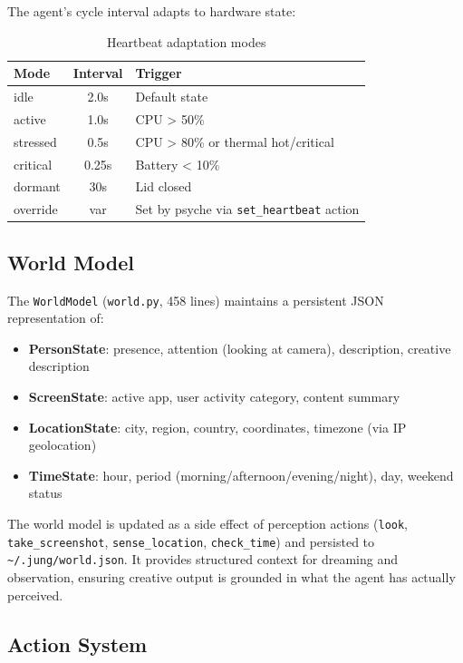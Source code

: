 \documentclass[11pt,oneside]{article}
\begin{document}
The agent's cycle interval adapts to hardware state:

\begin{table}[H]
\centering
\caption{Heartbeat adaptation modes}
\label{tab:heartbeat}
\small
\begin{tabular}{l c l}
\toprule
\textbf{Mode} & \textbf{Interval} & \textbf{Trigger} \\
\midrule
idle     & 2.0s  & Default state \\
active   & 1.0s  & CPU > 50\% \\
stressed & 0.5s  & CPU > 80\% or thermal hot/critical \\
critical & 0.25s & Battery < 10\% \\
dormant  & 30s   & Lid closed \\
override & var  & Set by psyche via \texttt{set\_heartbeat} action \\
\bottomrule
\end{tabular}
\end{table}

\subsection{World Model}

The \texttt{WorldModel} (\texttt{world.py}, 458 lines) maintains a persistent JSON representation of:

\begin{itemize}
  \item \textbf{PersonState}: presence, attention (looking at camera), description, creative description
  \item \textbf{ScreenState}: active app, user activity category, content summary
  \item \textbf{LocationState}: city, region, country, coordinates, timezone (via IP geolocation)
  \item \textbf{TimeState}: hour, period (morning/afternoon/evening/night), day, weekend status
\end{itemize}

The world model is updated as a side effect of perception actions (\texttt{look}, \texttt{take\_screenshot}, \texttt{sense\_location}, \texttt{check\_time}) and persisted to \texttt{\~{}/.jung/world.json}.
It provides structured context for dreaming and observation, ensuring creative output is grounded in what the agent has actually perceived.

\subsection{Action System}
\end{document}
